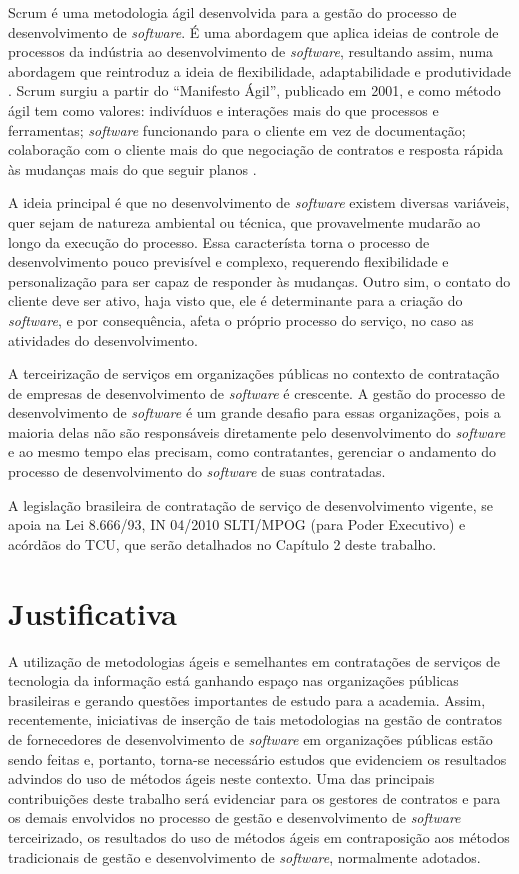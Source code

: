 Scrum é uma metodologia ágil desenvolvida para a gestão do processo de desenvolvimento de \textit{software}. É uma abordagem que aplica ideias de controle de processos da indústria ao desenvolvimento de \textit{software}, resultando assim, numa abordagem que reintroduz a ideia de flexibilidade, adaptabilidade e produtividade \cite{porto}. Scrum surgiu a partir do “Manifesto Ágil”, publicado em 2001, e como método ágil tem como valores: indivíduos e interações mais do que processos e ferramentas; \textit{software} funcionando para o cliente em vez de documentação; colaboração com o cliente mais do que negociação de contratos e resposta rápida às mudanças mais do que seguir planos \cite{manifesto}. 

A ideia principal é que no desenvolvimento de \textit{software} existem diversas variáveis, quer sejam de natureza ambiental ou técnica, que provavelmente mudarão ao longo da execução do processo. Essa característa torna o processo de desenvolvimento pouco previsível e complexo, requerendo flexibilidade e personalização para ser capaz de responder às mudanças. Outro sim, o contato do cliente deve ser ativo, haja visto que, ele é determinante para a criação do \textit{software}, e por consequência, afeta o próprio processo do serviço, no caso as atividades do desenvolvimento.

A terceirização de serviços em organizações públicas no contexto de contratação de empresas de desenvolvimento de \textit{software} é crescente. A gestão do processo de desenvolvimento de \textit{software} é um grande desafio para essas organizações, pois a maioria delas não são responsáveis diretamente pelo desenvolvimento do \textit{software} e ao mesmo tempo elas precisam, como contratantes, gerenciar o andamento do processo de desenvolvimento do \textit{software} de suas contratadas. 

A legislação brasileira de contratação de serviço de desenvolvimento vigente, se apoia na Lei 8.666/93, IN 04/2010 SLTI/MPOG (para Poder Executivo) e acórdãos do TCU, que serão detalhados no Capítulo 2 deste trabalho. 



\section[Justificativa]{Justificativa}

A utilização de metodologias ágeis e semelhantes em contratações de serviços de tecnologia da informação está ganhando espaço nas organizações públicas brasileiras e gerando questões importantes de estudo para a academia. Assim, recentemente, iniciativas de inserção de tais metodologias na gestão de contratos de fornecedores de desenvolvimento de \textit{software} em organizações públicas estão sendo feitas e, portanto, torna-se necessário estudos que evidenciem os resultados advindos do uso de métodos ágeis neste contexto. Uma das principais contribuições deste trabalho será evidenciar para os gestores de contratos e para os demais envolvidos no processo de gestão e desenvolvimento de \textit{software} terceirizado, os resultados do uso de métodos ágeis em contraposição aos métodos tradicionais de gestão e desenvolvimento de \textit{software}, normalmente adotados. 

